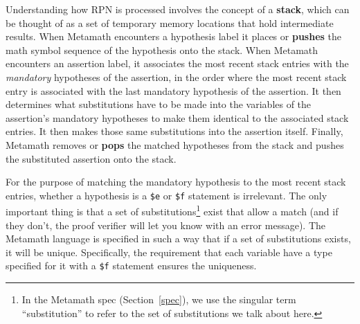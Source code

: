 Understanding how RPN is processed involves the concept of a {\bf
stack}, which can be thought of as a set of
temporary memory locations that hold intermediate results.  When Metamath
encounters a hypothesis label it places or {\bf pushes} the math
symbol sequence of the hypothesis onto the stack.  When Metamath encounters an
assertion label, it associates the most recent stack entries with the {\em
mandatory} hypotheses of the assertion, in the
order where the most recent stack entry is associated with the last mandatory
hypothesis of the assertion.  It then determines what
substitutions have
to be made into the variables of the assertion's mandatory hypotheses to make
them identical to the associated stack entries.  It then makes those same
substitutions into the assertion itself.  Finally, Metamath removes or {\bf
pops} the matched hypotheses from the stack and pushes the
substituted assertion onto the stack.

For the purpose of matching the mandatory hypothesis to the most recent stack
entries, whether a hypothesis is a \texttt{\$e} or \texttt{\$f} statement is
irrelevant.  The only important thing is that a set of
substitutions\footnote{In the Metamath spec (Section~\ref{spec}), we use the
singular term ``substitution'' to refer to the set of substitutions we talk
about here.} exist that allow a match (and if they don't, the proof verifier
will let you know with an error message).  The Metamath language is specified
in such a way that if a set of substitutions exists, it will be unique.
Specifically, the requirement that each variable have a type specified for it
with a \texttt{\$f} statement ensures the uniqueness.

